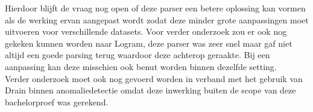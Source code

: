 Hierdoor blijft de vraag nog open of deze parser een betere oplossing kan vormen als de werking ervan aangepast wordt zodat deze minder grote aanpassingen moet uitvoeren voor verschillende datasets. Voor verder onderzoek zou er ook nog gekeken kunnen worden naar Logram, deze parser was zeer snel maar gaf niet altijd een goede parsing terug waardoor deze achterop geraakte. Bij een aanpassing kan deze misschien ook benut worden binnen dezelfde setting.\\

Verder onderzoek moet ook nog gevoerd worden in verband met het gebruik van Drain binnen anomaliedetectie omdat deze inwerking buiten de scope van deze bachelorproef was gerekend.